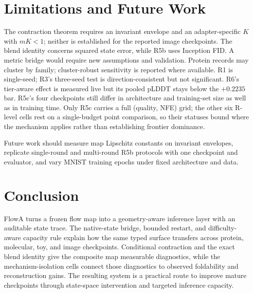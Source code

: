 \documentclass[journal,twocolumn,final]{IEEEtran}
\begin{document}
\section{Limitations and Future Work}
\label{sec:limitations}
The contraction theorem requires an invariant envelope and an adapter-specific $K$ with $mK<1$; neither is established for the reported image checkpoints. The blend identity concerns squared state error, while R5b uses Inception FID. A metric bridge would require new assumptions and validation. Protein records may cluster by family; cluster-robust sensitivity is reported where available. R1 is single-seed; R3's three-seed test is direction-consistent but not significant. R6's tier-aware effect is measured live but its pooled pLDDT stays below the $+0.2235$ bar. R5c's four checkpoints still differ in architecture and training-set size as well as in training time. Only R5c carries a full (quality, NFE) grid; the other six R-level cells rest on a single-budget point comparison, so their statuses bound where the mechanism applies rather than establishing frontier dominance.\par Future work should measure map Lipschitz constants on invariant envelopes, replicate single-round and multi-round R5b protocols with one checkpoint and evaluator, and vary MNIST training epochs under fixed architecture and data.

\section{Conclusion}
FlowA turns a frozen flow map into a geometry-aware inference layer with an auditable state trace. The native-state bridge, bounded restart, and difficulty-aware capacity rule explain how the same typed surface transfers across protein, molecular, toy, and image checkpoints. Conditional contraction and the exact blend identity give the composite map measurable diagnostics, while the mechanism-isolation cells connect those diagnostics to observed foldability and reconstruction gains. The resulting system is a practical route to improve mature checkpoints through state-space intervention and targeted inference capacity.
\end{document}
